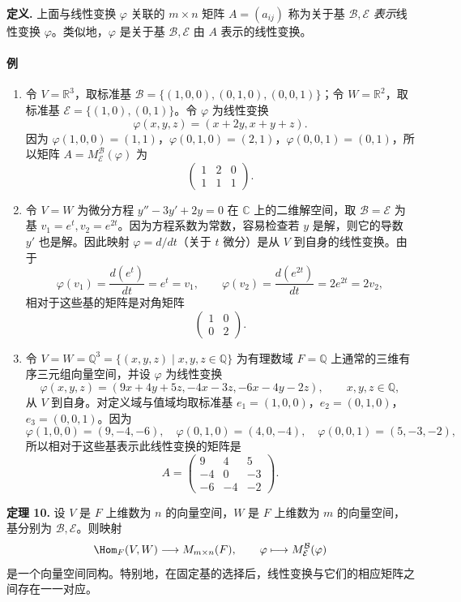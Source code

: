 \noindent\textbf{定义.} 上面与线性变换 $\varphi$ 关联的 $m\times n$ 矩阵 $A=(a_{ij})$ 称为关于基 $\mathcal B,\mathcal E$ \emph{表示}线性变换 $\varphi$。类似地，$\varphi$ 是关于基 $\mathcal B,\mathcal E$ 由 $A$ 表示的线性变换。

\paragraph{例}
\begin{enumerate}[label=(\arabic*)]
\item 令 $V=\mathbb R^3$，取标准基 $\mathcal B=\{(1,0,0),(0,1,0),(0,0,1)\}$；令 $W=\mathbb R^2$，取标准基 $\mathcal E=\{(1,0),(0,1)\}$。令 $\varphi$ 为线性变换
\[
\varphi(x,y,z)=(x+2y,x+y+z).
\]
因为 $\varphi(1,0,0)=(1,1)$，$\varphi(0,1,0)=(2,1)$，$\varphi(0,0,1)=(0,1)$，所以矩阵 $A=M_{\mathcal E}^{\mathcal B}(\varphi)$ 为
\[
\begin{pmatrix}1&2&0\\ 1&1&1\end{pmatrix}.
\]
\item 令 $V=W$ 为微分方程 $y''-3y'+2y=0$ 在 $\mathbb C$ 上的二维解空间，取 $\mathcal B=\mathcal E$ 为基 $v_1=e^t,v_2=e^{2t}$。因为方程系数为常数，容易检查若 $y$ 是解，则它的导数 $y'$ 也是解。因此映射 $\varphi=d/dt$（关于 $t$ 微分）是从 $V$ 到自身的线性变换。由于
\[
\varphi(v_1)=\frac{d(e^t)}{dt}=e^t=v_1,
\qquad
\varphi(v_2)=\frac{d(e^{2t})}{dt}=2e^{2t}=2v_2,
\]
相对于这些基的矩阵是对角矩阵
\[
\begin{pmatrix}1&0\\0&2\end{pmatrix}.
\]
\item 令 $V=W=\mathbb Q^3=\{(x,y,z)\mid x,y,z\in\mathbb Q\}$ 为有理数域 $F=\mathbb Q$ 上通常的三维有序三元组向量空间，并设 $\varphi$ 为线性变换
\[
\varphi(x,y,z)=(9x+4y+5z,-4x-3z,-6x-4y-2z),
\qquad x,y,z\in\mathbb Q,
\]
从 $V$ 到自身。对定义域与值域均取标准基 $e_1=(1,0,0)$，$e_2=(0,1,0)$，$e_3=(0,0,1)$。因为
\[
\varphi(1,0,0)=(9,-4,-6),\quad
\varphi(0,1,0)=(4,0,-4),\quad
\varphi(0,0,1)=(5,-3,-2),
\]
所以相对于这些基表示此线性变换的矩阵是
\[
A=\begin{pmatrix}
9&4&5\\
-4&0&-3\\
-6&-4&-2
\end{pmatrix}.
\]
\end{enumerate}

\noindent\textbf{定理 10.} 设 $V$ 是 $F$ 上维数为 $n$ 的向量空间，$W$ 是 $F$ 上维数为 $m$ 的向量空间，基分别为 $\mathcal B,\mathcal E$。则映射
\[
\Hom_F(V,W)\longrightarrow M_{m\times n}(F),
\qquad
\varphi\longmapsto M_{\mathcal E}^{\mathcal B}(\varphi)
\]
是一个向量空间同构。特别地，在固定基的选择后，线性变换与它们的相应矩阵之间存在一一对应。

